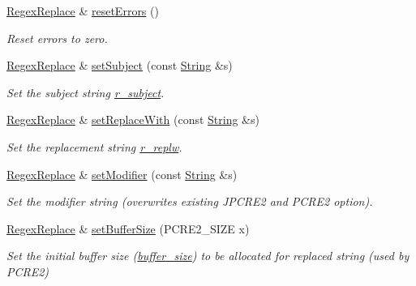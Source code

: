 \begin{DoxyCompactItemize}
\hyperlink{classjpcre2_1_1RegexReplace}{Regex\+Replace} \& \hyperlink{classjpcre2_1_1RegexReplace_a1d708fe8f948d260a8e033cff7898f9c_a1d708fe8f948d260a8e033cff7898f9c}{reset\+Errors} ()
\begin{DoxyCompactList}\small\item\em Reset errors to zero. \end{DoxyCompactList}\item 
\hyperlink{classjpcre2_1_1RegexReplace}{Regex\+Replace} \& \hyperlink{classjpcre2_1_1RegexReplace_a46eefdb105827920bebc8436721fa4cb_a46eefdb105827920bebc8436721fa4cb}{set\+Subject} (const \hyperlink{namespacejpcre2_a91f03070152fb228bc116c5a737f1d16}{String} \&s)
\begin{DoxyCompactList}\small\item\em Set the subject string \hyperlink{classjpcre2_1_1RegexReplace_a2290e5d9f1c2336abd431fef97e72c93}{r\+\_\+subject}. \end{DoxyCompactList}\item 
\hyperlink{classjpcre2_1_1RegexReplace}{Regex\+Replace} \& \hyperlink{classjpcre2_1_1RegexReplace_af1069f489de9b343493da2dc77b04c73_af1069f489de9b343493da2dc77b04c73}{set\+Replace\+With} (const \hyperlink{namespacejpcre2_a91f03070152fb228bc116c5a737f1d16}{String} \&s)
\begin{DoxyCompactList}\small\item\em Set the replacement string \hyperlink{classjpcre2_1_1RegexReplace_a73d0da1aac8b83a0a47b24629b5013f4}{r\+\_\+replw}. \end{DoxyCompactList}\item 
\hyperlink{classjpcre2_1_1RegexReplace}{Regex\+Replace} \& \hyperlink{classjpcre2_1_1RegexReplace_ae2abe2994b0fbe54950f88e63000c910_ae2abe2994b0fbe54950f88e63000c910}{set\+Modifier} (const \hyperlink{namespacejpcre2_a91f03070152fb228bc116c5a737f1d16}{String} \&s)
\begin{DoxyCompactList}\small\item\em Set the modifier string (overwrites existing J\+P\+C\+R\+E2 and P\+C\+R\+E2 option). \end{DoxyCompactList}\item 
\hyperlink{classjpcre2_1_1RegexReplace}{Regex\+Replace} \& \hyperlink{classjpcre2_1_1RegexReplace_a452dd2632031a13b39c13b792f18a491_a452dd2632031a13b39c13b792f18a491}{set\+Buffer\+Size} (P\+C\+R\+E2\+\_\+\+S\+I\+ZE x)
\begin{DoxyCompactList}\small\item\em Set the initial buffer size (\hyperlink{classjpcre2_1_1RegexReplace_a44abce541819ceb51e342411b48e95cb_a44abce541819ceb51e342411b48e95cb}{buffer\+\_\+size}) to be allocated for replaced string (used by P\+C\+R\+E2) \end{DoxyCompactList}\item 

\end{DoxyCompactItemize}
